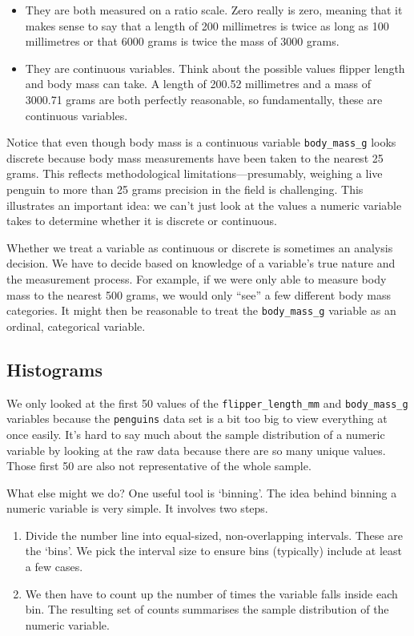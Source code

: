 \documentclass[
]{book}
\providecommand{\tightlist}{%
  \setlength{\itemsep}{0pt}\setlength{\parskip}{0pt}}
\begin{document}
\begin{itemize}
\tightlist
\item
  They are both measured on a ratio scale. Zero really is zero, meaning that it makes sense to say that a length of 200 millimetres is twice as long as 100 millimetres or that 6000 grams is twice the mass of 3000 grams.
\item
  They are continuous variables. Think about the possible values flipper length and body mass can take. A length of 200.52 millimetres and a mass of 3000.71 grams are both perfectly reasonable, so fundamentally, these are continuous variables.
\end{itemize}

Notice that even though body mass is a continuous variable \texttt{body\_mass\_g} looks discrete because body mass measurements have been taken to the nearest 25 grams. This reflects methodological limitations---presumably, weighing a live penguin to more than 25 grams precision in the field is challenging. This illustrates an important idea: we can't just look at the values a numeric variable takes to determine whether it is discrete or continuous.

Whether we treat a variable as continuous or discrete is sometimes an analysis decision. We have to decide based on knowledge of a variable's true nature and the measurement process. For example, if we were only able to measure body mass to the nearest 500 grams, we would only ``see'' a few different body mass categories. It might then be reasonable to treat the \texttt{body\_mass\_g} variable as an ordinal, categorical variable.

\hypertarget{histograms}{%
\subsection{Histograms}\label{histograms}}

We only looked at the first 50 values of the \texttt{flipper\_length\_mm} and \texttt{body\_mass\_g} variables because the \texttt{penguins} data set is a bit too big to view everything at once easily. It's hard to say much about the sample distribution of a numeric variable by looking at the raw data because there are so many unique values. Those first 50 are also not representative of the whole sample.

What else might we do? One useful tool is `binning'. The idea behind binning a numeric variable is very simple. It involves two steps.

\begin{enumerate}
\def\labelenumi{\arabic{enumi}.}
\tightlist
\item
  Divide the number line into equal-sized, non-overlapping intervals. These are the `bins'. We pick the interval size to ensure bins (typically) include at least a few cases.
\item
  We then have to count up the number of times the variable falls inside each bin. The resulting set of counts summarises the sample distribution of the numeric variable.
\end{enumerate}
\end{document}
